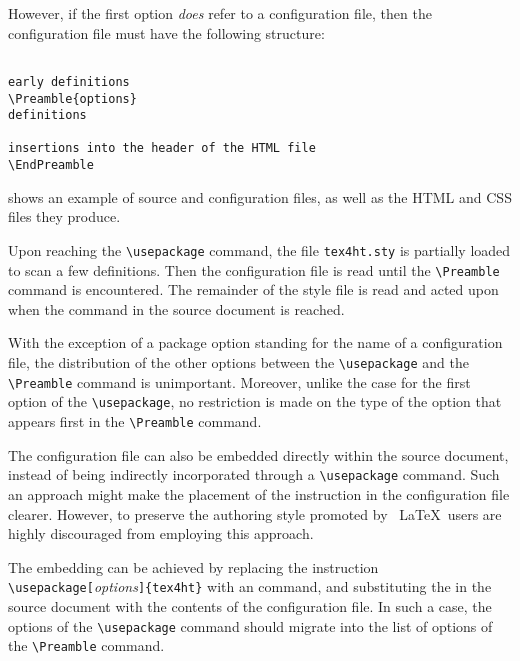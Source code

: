 However, if the first option \emph{does} refer to a configuration file, then the configuration 
file must have the following structure: 

\begin{lstlisting}

early definitions 
\Preamble{options} 
definitions
 
insertions into the header of the HTML file 
\EndPreamble 

\end{lstlisting}

 shows an example of source and configuration files, as well as the HTML 
and CSS files they produce. 

Upon reaching the \verb|\usepackage| command, the file \verb|tex4ht.sty| is partially 
loaded to scan a few definitions. Then the configuration file is read until the 
\verb|\Preamble| command is encountered. The remainder of the style file is read and 
acted upon when the \verb|| command in the source document is 
reached. 

With the exception of a package option standing for the name of a
configuration file, the distribution of the other options between the
\verb|\usepackage| and the \verb|\Preamble| command is unimportant.
Moreover, unlike the case for the first option of the
\verb|\usepackage|, no restriction is made on the type of the option
that appears first in the \verb|\Preamble| command. 


The configuration file can also be embedded directly within the source
document, instead of being indirectly incorporated through a
\verb|\usepackage| command. Such an approach might make the placement of
the \verb|| instruction in the configuration file
clearer. However, to preserve the authoring style promoted by \ \LaTeX\, 
users are highly discouraged from employing this approach. 
 


The embedding can be achieved by replacing the instruction 
\verb|\usepackage[|\emph{options}\verb|]{tex4ht}| with an \verb|| command, and 
substituting the \verb|| in the source document with the contents of 
the configuration file. In such a case, the options of the \verb|\usepackage| command 
should migrate into the list of options of the \verb|\Preamble| command. 

